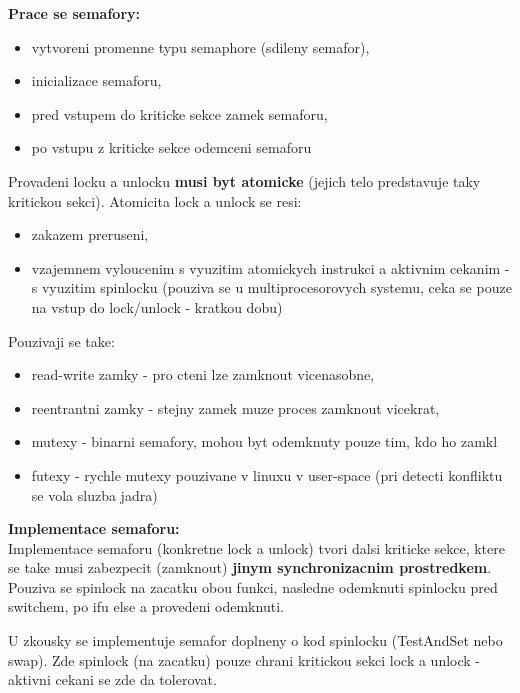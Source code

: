 \documentclass[a4paper, 11pt]{article}
\begin{document}
\textbf{Prace se semafory:}
\begin{itemize}
    \item vytvoreni promenne typu semaphore (sdileny semafor),
    \item inicializace semaforu,
    \item pred vstupem do kriticke sekce zamek semaforu,
    \item po vstupu z kriticke sekce odemceni semaforu \\
\end{itemize}

Provadeni locku a unlocku \textbf{musi byt atomicke} (jejich telo predstavuje taky kritickou sekci). Atomicita lock a unlock se resi:
\begin{itemize}
    \item zakazem preruseni,
    \item vzajemnem vyloucenim s vyuzitim atomickych instrukci a aktivnim cekanim - s vyuzitim spinlocku (pouziva se u multiprocesorovych systemu, ceka se pouze na vstup do lock/unlock - kratkou dobu) \\
\end{itemize}

Pouzivaji se take:
\begin{itemize}
    \item read-write zamky - pro cteni lze zamknout vicenasobne,
    \item reentrantni zamky - stejny zamek muze proces zamknout vicekrat,
    \item mutexy - binarni semafory, mohou byt odemknuty pouze tim, kdo ho zamkl
    \item futexy - rychle mutexy pouzivane v linuxu v user-space (pri detecti konfliktu se vola sluzba jadra) \\
\end{itemize}

\textbf{Implementace semaforu:} \\
Implementace semaforu (konkretne lock a unlock) tvori dalsi kriticke sekce, ktere se take musi zabezpecit (zamknout) \textbf{jinym synchronizacnim prostredkem}. Pouziva se spinlock na zacatku obou funkci, nasledne odemknuti spinlocku pred switchem, po ifu else a provedeni odemknuti. 

U zkousky se implementuje semafor doplneny o kod spinlocku (TestAndSet nebo swap). Zde spinlock (na zacatku) pouze chrani kritickou sekci lock a unlock - aktivni cekani se zde da tolerovat. \\
\end{document}
